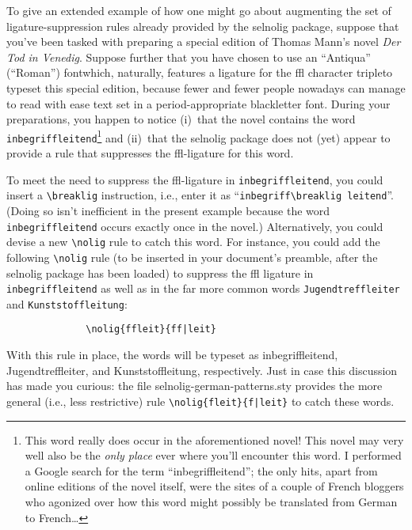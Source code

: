 \documentclass[11pt]{article}
\newcommand{\pkg}[1]{\textsf{#1}}
\newcommand{\opt}[1]{\texttt{#1}}
\newcommand{\cmmd}[1]{\texttt{\textbackslash #1}}
\begin{document}
To give an extended example of how one might go about augmenting the set of ligature-suppression rules already provided by the \pkg{selnolig} package, suppose that you've been tasked with preparing a special edition of Thomas Mann's novel \emph{Der Tod in Venedig}. Suppose further that you have chosen to use an \enquote{Antiqua} (\enquote{Roman}) font\textemdash which, naturally, features a ligature for the ffl character triple\textemdash to typeset this special edition,  because fewer and fewer people nowadays can manage to read with ease text set in a {\blackletterfont period-appropriate blackletter font}. During your preparations, you happen to notice (i)~that the novel contains the word \opt{inbegriffleitend}\footnote{This word really does occur in the aforementioned novel! This novel may very well also be the \emph{only place} ever where you'll encounter this word. I performed a Google search for the term \enquote{inbegriffleitend}; the only hits, apart from online editions of the novel itself, were the sites of a couple of French bloggers who agonized over how this word might possibly be translated from German to French\dots} and (ii)~that the \pkg{selnolig} package does not (yet) appear to provide a rule that suppresses the ffl-ligature for this word. 

To meet the need to suppress the ffl-ligature in \opt{inbegriffleitend}, you could insert a \cmmd{breaklig} instruction, i.e., enter it as ``\Verb|inbegriff\breaklig leitend|''. (Doing so isn't inefficient in the present example because the word \opt{inbegriffleitend} occurs exactly once in the novel.) Alternatively, you could devise a new \cmmd{nolig} rule to catch this word. For instance, you could add the following \cmmd{nolig} rule (to be inserted in your document's preamble, after the \pkg{selnolig} package has been loaded) to suppress the ffl ligature in  \opt{inbegriffleitend} as well as in the far more common words \opt{Jugendtreffleiter} and \opt{Kunststoffleitung}:
\begin{Verbatim}
              \nolig{ffleit}{ff|leit}
\end{Verbatim}
With this rule in place, the words will be typeset as inbegriffleitend, Jugendtreffleiter, and Kunststoffleitung, respectively. Just in case this discussion has made you curious: the file \pkg{selnolig-german-patterns.sty} provides the more general (i.e., less restrictive) rule \Verb+\nolig{fleit}{f|leit}+ to catch these words.
\end{document}
